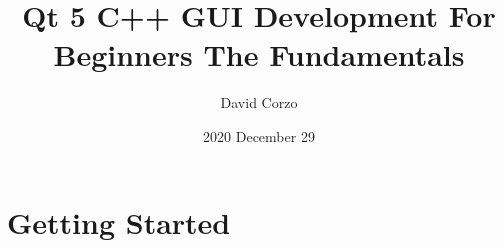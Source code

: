 \documentclass{book}
\title{Qt 5 C++ GUI Development For Beginners  The Fundamentals}
\date{2020 December 29} %
\author{David Corzo}
\begin{document}
\maketitle
\tableofcontents

\chapter{Getting Started}




\end{document}
